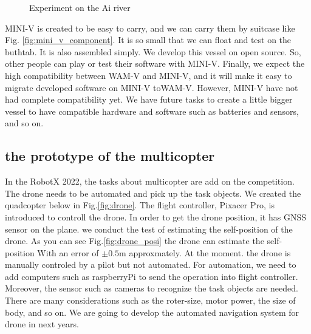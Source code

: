 \documentclass[lettersize,journal]{IEEEtran}
\begin{document}
\begin{figure}[t]
    \begin{center}
    \end{center}
    \caption{Experiment on the Ai river}
    \label{fig:mini_v_experiment}
  \end{figure}

MINI-V is created to be easy to carry, and we can carry them by suitcase like Fig. \ref{fig:mini_v_component}. It is so small that we can
float and test on the buthtab.
It is also assembled simply. We develop this vessel on open source. So, other people can play or test their software with MINI-V. Finally,
we expect the high compatibility between WAM-V and MINI-V, and it will make it easy to migrate developed software on MINI-V toWAM-V. However, 
MINI-V have not had complete compatibility yet.
We have future tasks to create a little bigger vessel to have compatible hardware and software such as batteries and sensors, and so on.

\subsection{the prototype of the multicopter}
In the RobotX 2022, the tasks about multicopter are add on the competition. The drone needs to be automated and pick up the task objects.
We created the quadcopter below in Fig.\ref{fig:drone}.
The flight controller, Pixacer Pro, is introduced to controll the drone. 
In order to get the drone position, it has GNSS sensor on the plane.
we conduct the test of estimating the self-position of the drone. As you can see Fig.\ref{fig:drone_posi} the drone can estimate
the self-position With an error of $\pm 0.5 \mathrm{m}$ approxmately.
At the moment. the drone is manually controled by a pilot but not automated.
For automation, we need to add computers such as raspberryPi to send the operation into flight controller. 
Moreover, the sensor such as cameras to recognize the task objects are needed.
There are many considerations such as the roter-size, motor power, the size of body, and so on.
We are going to develop the automated navigation system for drone in next years.
\end{document}
